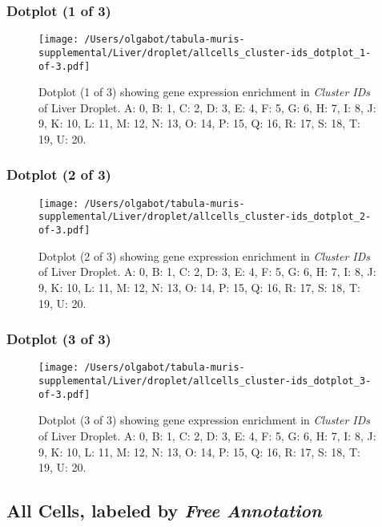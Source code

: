 \clearpage

\subsubsection{Dotplot (1 of 3)}
\begin{figure}[h]
\centering
\texttt{[image: /Users/olgabot/tabula-muris-supplemental/Liver/droplet/allcells\_cluster-ids\_dotplot\_1-of-3.pdf]}

\caption{ Dotplot (1 of 3)  showing gene expression enrichment in \emph{Cluster IDs} of Liver Droplet. A: 0, B: 1, C: 2, D: 3, E: 4, F: 5, G: 6, H: 7, I: 8, J: 9, K: 10, L: 11, M: 12, N: 13, O: 14, P: 15, Q: 16, R: 17, S: 18, T: 19, U: 20.}
\end{figure}


\clearpage

\subsubsection{Dotplot (2 of 3)}
\begin{figure}[h]
\centering
\texttt{[image: /Users/olgabot/tabula-muris-supplemental/Liver/droplet/allcells\_cluster-ids\_dotplot\_2-of-3.pdf]}

\caption{ Dotplot (2 of 3)  showing gene expression enrichment in \emph{Cluster IDs} of Liver Droplet. A: 0, B: 1, C: 2, D: 3, E: 4, F: 5, G: 6, H: 7, I: 8, J: 9, K: 10, L: 11, M: 12, N: 13, O: 14, P: 15, Q: 16, R: 17, S: 18, T: 19, U: 20.}
\end{figure}


\clearpage

\subsubsection{Dotplot (3 of 3)}
\begin{figure}[h]
\centering
\texttt{[image: /Users/olgabot/tabula-muris-supplemental/Liver/droplet/allcells\_cluster-ids\_dotplot\_3-of-3.pdf]}

\caption{ Dotplot (3 of 3)  showing gene expression enrichment in \emph{Cluster IDs} of Liver Droplet. A: 0, B: 1, C: 2, D: 3, E: 4, F: 5, G: 6, H: 7, I: 8, J: 9, K: 10, L: 11, M: 12, N: 13, O: 14, P: 15, Q: 16, R: 17, S: 18, T: 19, U: 20.}
\end{figure}


\clearpage

\subsection{All Cells, labeled by \emph{Free Annotation}}
